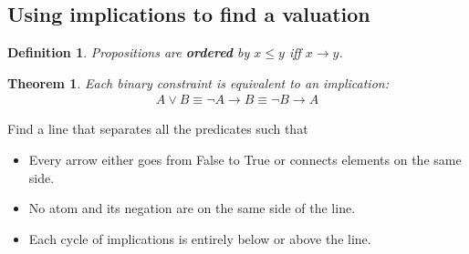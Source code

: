 \documentclass{article}
\theoremstyle{sltheorem}
\newtheorem{definition}{Definition}
\newtheorem{theorem}{Theorem}
\begin{document}
\subsection{Using implications to find a valuation}
\begin{definition}
    Propositions are \textbf{ordered} by $x\leq y$ iff $x\to y$.
\end{definition}
\begin{theorem}
    Each binary constraint is equivalent to an implication:
    \begin{align*}
        A \vee B \equiv \neg A \to B \equiv \neg B \to A
    \end{align*}
\end{theorem}
\noindent Find a line that separates all the predicates such that
\begin{itemize}
    \item Every arrow either goes from False to True or connects elements on the same side.
    \item No atom and its negation are on the same side of the line.
    \item Each cycle of implications is entirely below or above the line.
\end{itemize}
\end{document}
